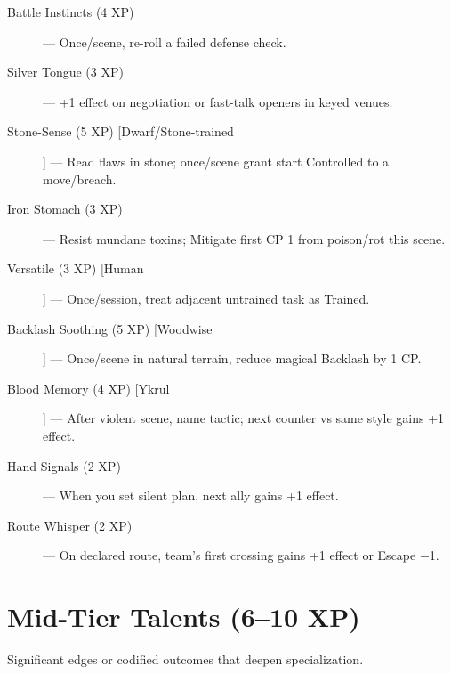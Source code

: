 \begin{description}
  \item[Battle Instincts (4 XP)] — Once/scene, re-roll a failed defense check.
  \item[Silver Tongue (3 XP)] — +1 effect on negotiation or fast-talk openers in keyed venues.
  \item[Stone-Sense (5 XP) [Dwarf/Stone-trained]] — Read flaws in stone; once/scene grant start Controlled to a move/breach.
  \item[Iron Stomach (3 XP)] — Resist mundane toxins; Mitigate first CP 1 from poison/rot this scene.
  \item[Versatile (3 XP) [Human]] — Once/session, treat adjacent untrained task as Trained.
  \item[Backlash Soothing (5 XP) [Woodwise]] — Once/scene in natural terrain, reduce magical Backlash by 1 CP.
  \item[Blood Memory (4 XP) [Ykrul]] — After violent scene, name tactic; next counter vs same style gains +1 effect.
  \item[Hand Signals (2 XP)] — When you set silent plan, next ally gains +1 effect.
  \item[Route Whisper (2 XP)] — On declared route, team's first crossing gains +1 effect or Escape −1.
\end{description}

\section{Mid-Tier Talents (6–10 XP)}

Significant edges or codified outcomes that deepen specialization.

